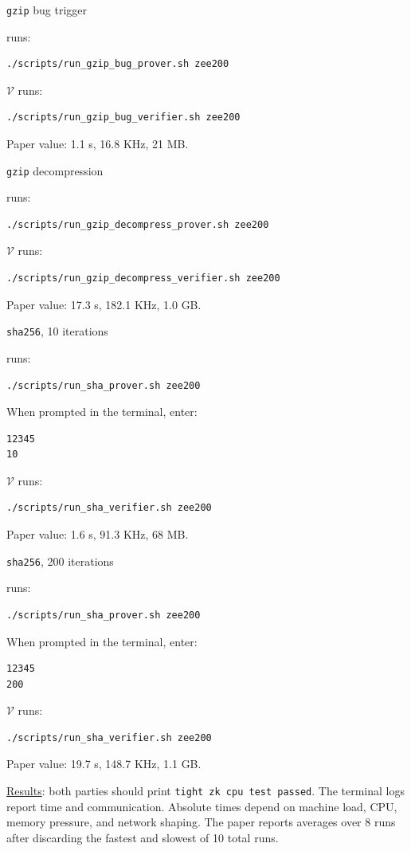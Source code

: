 \documentclass[nonacm,sigconf]{acmart}
\let\P\undefined
\newcommand{\P}{\ensuremath{\mathcal{P}}\xspace}
\newcommand{\V}{\ensuremath{\mathcal{V}}\xspace}
\newcommand{\passmsg}{\texttt{tight zk cpu test passed}}
\begin{document}
\begin{compactitem}
\item \texttt{gzip} bug trigger

\P runs:
\begin{verbatim}
./scripts/run_gzip_bug_prover.sh zee200
\end{verbatim}
\V runs:
\begin{verbatim}
./scripts/run_gzip_bug_verifier.sh zee200
\end{verbatim}
Paper value: 1.1 s, 16.8 KHz, 21 MB.

\item \texttt{gzip} decompression

\P runs:
\begin{verbatim}
./scripts/run_gzip_decompress_prover.sh zee200
\end{verbatim}
\V runs:
\begin{verbatim}
./scripts/run_gzip_decompress_verifier.sh zee200
\end{verbatim}
Paper value: 17.3 s, 182.1 KHz, 1.0 GB.

\item \texttt{sha256}, 10 iterations

\P runs:
\begin{verbatim}
./scripts/run_sha_prover.sh zee200
\end{verbatim}
When prompted in the \P terminal, enter:
\begin{verbatim}
12345
10
\end{verbatim}
\V runs:
\begin{verbatim}
./scripts/run_sha_verifier.sh zee200
\end{verbatim}
Paper value: 1.6 s, 91.3 KHz, 68 MB.

\item \texttt{sha256}, 200 iterations

\P runs:
\begin{verbatim}
./scripts/run_sha_prover.sh zee200
\end{verbatim}
When prompted in the \P terminal, enter:
\begin{verbatim}
12345
200
\end{verbatim}
\V runs:
\begin{verbatim}
./scripts/run_sha_verifier.sh zee200
\end{verbatim}
Paper value: 19.7 s, 148.7 KHz, 1.1 GB.
\end{compactitem}

\noindent
\underline{Results}: both parties should print \passmsg. The terminal
logs report time and communication. Absolute times depend on machine
load, CPU, memory pressure, and network shaping. The paper reports
averages over 8 runs after discarding the fastest and slowest of 10
total runs.
\end{document}
